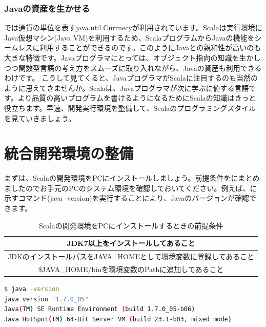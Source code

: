 \section*{Javaの資産を生かせる}
では通貨の単位を表すjava.util.Currnecyが利用されています。Scalaは実行環境にJava仮想マシン(Java VM)を利用するため、ScalaプログラムからJavaの機能をシームレスに利用することができるのです。このようにJavaとの親和性が高いのも大きな特徴です。Javaプログラマにとっては、オブジェクト指向の知識を生かしつつ関数型言語の考え方をスムーズに取り入れながら、Javaの資産も利用できるわけです。 こうして見てくると、JavaプログラマがScalaに注目するのも当然のように思えてきませんか。Scalaは、Javaプログラマが次に学ぶに値する言語です。より品質の高いプログラムを書けるようになるためにScalaの知識はきっと役立ちます。早速、開発実行環境を整備して、Scalaのプログラミングスタイルを見ていきましょう。
\part{統合開発環境の整備}
まずは、Scalaの開発環境をPCにインストールしましょう。前提条件をにまとめましたのでお手元のPCのシステム環境を確認しておいてください。例えば、に示すコマンド(java -version)を実行することにより、Javaのバージョンが確認できます。 

\begin{table}[htb]
  \caption{Scalaの開発環境をPCにインストールするときの前提条件}
  \begin{center}
    \begin{tabular}{|c|} \hline
      JDK7以上をインストールしてあること\\ \hline
      JDKのインストールパスをJAVA\_HOMEとして環境変数に登録してあること\\ \hline
      \$JAVA\_HOME/binを環境変数のPathに追加してあること\\ \hline 
    \end{tabular}
  \end{center}
  \label{tb:scala_pre_conditions}
\end{table}

\begin{lstlisting}[language=bash, frame=none, label=cmd:java_version, caption=Javaのバージョンを確認する方法]
$ java -version
java version "1.7.0_05"
Java(TM) SE Runtime Environment (build 1.7.0_05-b06)
Java HotSpot(TM) 64-Bit Server VM (build 23.1-b03, mixed mode)
\end{lstlisting}


